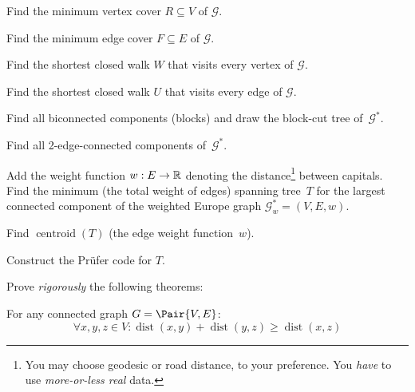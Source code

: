 \documentclass[a4paper,12pt]{article}
\newcommand{\MyGraph}{\mathcal{G}}
\newcommand{\MyGraphFull}{\MyGraph^{*}}
\newcommand{\op}[1]{\operatorname*{#1}}
\newcommand{\dist}[1]{\op{dist}(#1)}
\newcommand{\graphRadius}[1]{\op{rad}(#1)}
\newcommand{\graphDiameter}[1]{\op{diam}(#1)}
\newcommand{\graphCentroid}[1]{\op{centroid}(#1)}
\begin{document}
\begin{tasks}
\begin{subtasks}
        \item Find the minimum vertex cover $R \subseteq V$ of $\MyGraph$.

        \item Find the minimum edge cover $F \subseteq E$ of $\MyGraph$.

        \item Find the shortest closed walk $W$ that visits every vertex of $\MyGraph$.

        \item Find the shortest closed walk $U$ that visits every edge of $\MyGraph$.

        \item Find all biconnected components (blocks) and draw the block-cut tree of~$\MyGraphFull$.

        \item Find all 2-edge-connected components of~$\MyGraphFull$.


        \item Add the weight function $w : E \to \mathbb{R}$ denoting the distance\footnote{You may choose geodesic or road distance, to your preference. You \emph{have} to use \emph{more-or-less real} data.} between capitals.
        Find the minimum (\wrt the total weight of edges) spanning tree~$T$ for the largest connected component of the weighted Europe graph $\MyGraphFull_{w} = (V, E, w)$.

        \item Find $\graphCentroid{T}$ (\wrt the edge weight function~$w$).

        \item Construct the Pr\"{u}fer code for $T$.
    \end{subtasks}


    \item Prove \emph{rigorously} the following theorems:

    \begin{theorem}
        For any connected graph $G = \Pair{V, E}$:
        \[
            \forall x,y,z \in V : \dist{x,y} + \dist{y,z} \geq \dist{x,z}
        \]
    \end{theorem}



\end{tasks}
\end{document}
